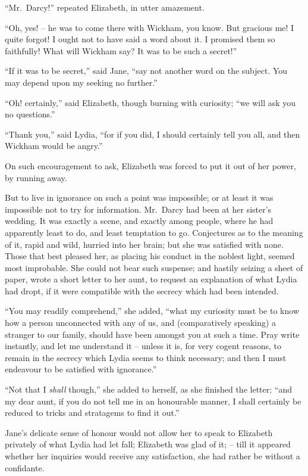 “Mr.\ Darcy!” repeated Elizabeth, in utter amazement.

“Oh, yes! -- he was to come there with Wickham, you
know. But gracious me! I quite forgot! I ought not to
have said a word about it. I promised them so faithfully!
What will Wickham say? It was to be such a secret!”

“If it was to be secret,” said Jane, “say not another
word on the subject. You may depend upon my seeking
no further.”

“Oh! certainly,” said Elizabeth, though burning with
curiosity; “we will ask you no questions.”

“Thank you,” said Lydia, “for if you did, I should
certainly tell you all, and then Wickham would be
angry.”

On such encouragement to ask, Elizabeth was forced
to put it out of her power, by running away.

But to live in ignorance on such a point was impossible;
or at least it was impossible not to try for information.
Mr.\ Darcy had been at her sister’s wedding. It was
exactly a scene, and exactly among people, where he had
apparently least to do, and least temptation to go. Conjectures
as to the meaning of it, rapid and wild, hurried
into her brain; but she was satisfied with none. Those
that best pleased her, as placing his conduct in the noblest
light, seemed most improbable. She could not bear such
suspense; and hastily seizing a sheet of paper, wrote
a short letter to her aunt, to request an explanation of
what Lydia had dropt, if it were compatible with the
secrecy which had been intended.

“You may readily comprehend,” she added, “what my
curiosity must be to know how a person unconnected with
any of us, and (comparatively speaking) a stranger to our
family, should have been amongst you at such a time.
Pray write instantly, and let me understand it -- unless it
is, for very cogent reasons, to remain in the secrecy which
Lydia seems to think necessary; and then I must endeavour
to be satisfied with ignorance.”

“Not that I \textit{shall} though,” she added to herself, as
she finished the letter; “and my dear aunt, if you do
not tell me in an honourable manner, I shall certainly
be reduced to tricks and stratagems to find it out.”

Jane’s delicate sense of honour would not allow her to
speak to Elizabeth privately of what Lydia had let fall;
Elizabeth was glad of it; -- till it appeared whether her
inquiries would receive any satisfaction, she had rather
be without a confidante.

